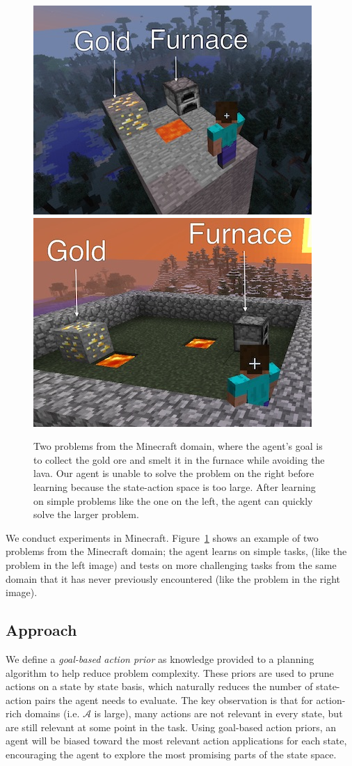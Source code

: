 \documentclass[11pt]{article}
\begin{document}
\begin{figure}
\centering
\includegraphics[width=0.35\linewidth]{figures/smelt_scaled_small.jpg}
\hspace{10mm}
\includegraphics[width=0.35\linewidth]{figures/smelt_labeled_large.jpg}
\caption{Two problems from the Minecraft domain, where the
  agent's goal is to collect the gold ore and smelt it in the furnace while avoiding the
  lava.  Our agent is unable to solve the problem on the right before
  learning because the state-action space is too large. After learning on simple problems
  like the one on the left, the agent can quickly
  solve the larger problem.\label{fig:example}}
\end{figure}

We conduct experiments in Minecraft. Figure~\ref{fig:example}
shows an example of two problems from the Minecraft domain; the agent learns on simple tasks,
(like the problem in the left image) and tests
on more challenging tasks from the same domain that it has never previously
encountered (like the problem in the right image).

\subsection{Approach}
We define a {\it goal-based action prior} as knowledge provided to a planning algorithm to help reduce problem complexity. These priors are used to prune actions on a state by state basis, which naturally reduces the number of state-action pairs the agent needs to evaluate. The key observation is that for action-rich domains (i.e. $\mathcal{A}$ is large), many actions are not relevant in every state, but are still relevant at some point in the task. Using goal-based action priors, an agent will be biased toward the most relevant action applications for each state, encouraging the agent to explore the most promising parts of the state space.
\end{document}
